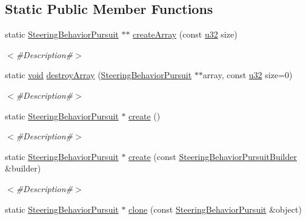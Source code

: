 \subsection*{Static Public Member Functions}
\begin{DoxyCompactItemize}
\item 
static \mbox{\hyperlink{classnjli_1_1_steering_behavior_pursuit}{Steering\+Behavior\+Pursuit}} $\ast$$\ast$ \mbox{\hyperlink{classnjli_1_1_steering_behavior_pursuit_a7778636233f52befa9417ffea537535a}{create\+Array}} (const \mbox{\hyperlink{_util_8h_a10e94b422ef0c20dcdec20d31a1f5049}{u32}} size)
\begin{DoxyCompactList}\small\item\em $<$\#\+Description\#$>$ \end{DoxyCompactList}\item 
static \mbox{\hyperlink{_thread_8h_af1e856da2e658414cb2456cb6f7ebc66}{void}} \mbox{\hyperlink{classnjli_1_1_steering_behavior_pursuit_ada097ed44a5a94d9ca39f15b60ee01ef}{destroy\+Array}} (\mbox{\hyperlink{classnjli_1_1_steering_behavior_pursuit}{Steering\+Behavior\+Pursuit}} $\ast$$\ast$array, const \mbox{\hyperlink{_util_8h_a10e94b422ef0c20dcdec20d31a1f5049}{u32}} size=0)
\begin{DoxyCompactList}\small\item\em $<$\#\+Description\#$>$ \end{DoxyCompactList}\item 
static \mbox{\hyperlink{classnjli_1_1_steering_behavior_pursuit}{Steering\+Behavior\+Pursuit}} $\ast$ \mbox{\hyperlink{classnjli_1_1_steering_behavior_pursuit_a2503bd77be53a0648fd2e0d1f7c2f8c4}{create}} ()
\begin{DoxyCompactList}\small\item\em $<$\#\+Description\#$>$ \end{DoxyCompactList}\item 
static \mbox{\hyperlink{classnjli_1_1_steering_behavior_pursuit}{Steering\+Behavior\+Pursuit}} $\ast$ \mbox{\hyperlink{classnjli_1_1_steering_behavior_pursuit_aa20d6fa6c0a7017b155268fe441098e0}{create}} (const \mbox{\hyperlink{classnjli_1_1_steering_behavior_pursuit_builder}{Steering\+Behavior\+Pursuit\+Builder}} \&builder)
\begin{DoxyCompactList}\small\item\em $<$\#\+Description\#$>$ \end{DoxyCompactList}\item 
static \mbox{\hyperlink{classnjli_1_1_steering_behavior_pursuit}{Steering\+Behavior\+Pursuit}} $\ast$ \mbox{\hyperlink{classnjli_1_1_steering_behavior_pursuit_a8d2ade5faa2fa7dfc18470fd020902c6}{clone}} (const \mbox{\hyperlink{classnjli_1_1_steering_behavior_pursuit}{Steering\+Behavior\+Pursuit}} \&object)

\end{DoxyCompactItemize}

